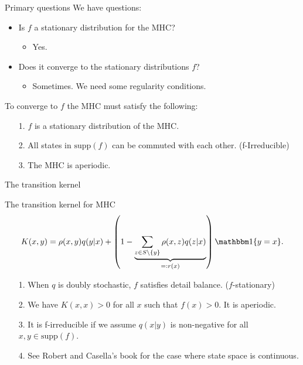 \documentclass[11pt]{beamer}
\begin{document}
    \begin{frame}{Primary questions}
        We have questions: 
        \begin{itemize}
            \item Is $f$ a stationary distribution for the MHC? 
                \begin{itemize}
                    \item Yes. 
                \end{itemize}
            \item Does it converge to the stationary distributions $f$? 
            \begin{itemize}
                \item Sometimes. We need some regularity conditions. 
            \end{itemize}
        \end{itemize}
        \vspace{2em}
        To converge to $f$ the MHC must satisfy the following: 
        \begin{itemize}
            \item [1.] $f$ is a stationary distribution of the MHC. 
            \item [2.] All states in $\text{supp}(f)$ can be commuted with each other. (f-Irreducible)
            \item [3.] The MHC is aperiodic. 
        \end{itemize}
    \end{frame}
    \begin{frame}{The transition kernel}
        \begin{block}{The transition kernel for MHC}
            \begin{align*}
                K(x, y) = 
                \rho(x, y)q(y|x) + 
                \left(
                    1 - \underbrace{\sum_{z \in S\setminus \{y\} }^{}\rho(x, z)q(z|x)}_{=:r(x)}
                \right) \mathbbm 1\{y = x\}. 
            \end{align*}
        \end{block}
        \begin{itemize}
            \item [1.] When $q$ is doubly stochastic, $f$ satisfies detail balance. ($f$-stationary)
            \item [2.] We have $K(x,x)> 0$ for all $x$ such that $f(x) > 0$. It is aperiodic. 
            \item [3.] It is f-irreducible if we assume $q(x|y)$ is non-negative for all $x, y\in \text{supp}(f)$. 
            \item [4.] See Robert and Casella's book \cite{book:robert_casella_2005} for the case where state space is continuous. 
        \end{itemize}
    \end{frame}
\end{document}
